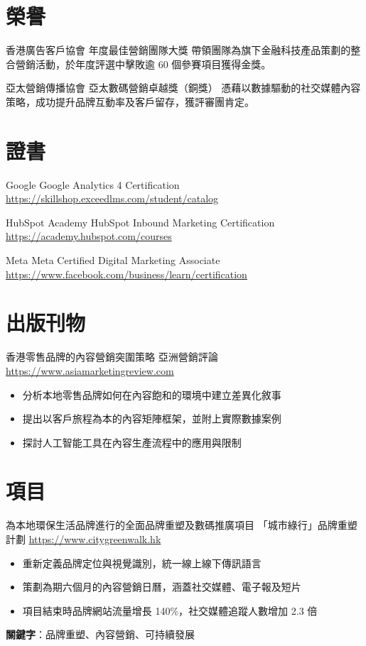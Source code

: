 \documentclass[a4paper, serif, 10pt]{moderncv}
\begin{document}
\section{榮譽}

        {香港廣告客戶協會}
        {年度最佳營銷團隊大獎}
        {}
        {}
        {帶領團隊為旗下金融科技產品策劃的整合營銷活動，於年度評選中擊敗逾 60 個參賽項目獲得金獎。}

        {亞太營銷傳播協會}
        {亞太數碼營銷卓越獎（銅獎）}
        {}
        {}
        {憑藉以數據驅動的社交媒體內容策略，成功提升品牌互動率及客戶留存，獲評審團肯定。}
\section{證書}

        {Google}
        {Google Analytics 4 Certification}
        {\url{https://skillshop.exceedlms.com/student/catalog}}
        {}
        {}

        {HubSpot Academy}
        {HubSpot Inbound Marketing Certification}
        {\url{https://academy.hubspot.com/courses}}
        {}
        {}

        {Meta}
        {Meta Certified Digital Marketing Associate}
        {\url{https://www.facebook.com/business/learn/certification}}
        {}
        {}
\section{出版刊物}

        {香港零售品牌的內容營銷突圍策略}
        {亞洲營銷評論}
        {\url{https://www.asiamarketingreview.com}}
        {}
        {\begin{itemize}
\item 分析本地零售品牌如何在內容飽和的環境中建立差異化敘事
\item 提出以客戶旅程為本的內容矩陣框架，並附上實際數據案例
\item 探討人工智能工具在內容生產流程中的應用與限制
\end{itemize}}
\section{項目}

        {為本地環保生活品牌進行的全面品牌重塑及數碼推廣項目}
        {「城巿綠行」品牌重塑計劃}
        {\url{https://www.citygreenwalk.hk}}
        {}
        {\begin{itemize}
\item 重新定義品牌定位與視覺識別，統一線上線下傳訊語言
\item 策劃為期六個月的內容營銷日曆，涵蓋社交媒體、電子報及短片
\item 項目結束時品牌網站流量增長 140\%，社交媒體追蹤人數增加 2.3 倍
\end{itemize}
\textbf{關鍵字}：品牌重塑、內容營銷、可持續發展}
\end{document}
